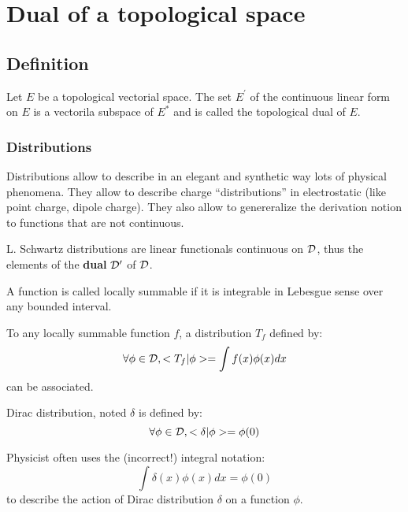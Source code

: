 \documentclass[12pt]{book}
\begin{document}
\chapter{Dual of a topological space}

\section{Definition}
\begin{defn}
Let $E$ be a topological vectorial space. The set $E^\prime$ of the
continuous linear form on $E$ is a vectorila subspace of $E^*$ and is
called the topological dual of $E$.
\end{defn}



\subsection{Distributions}\label{chapdistr}
Distributions allow to describe in an elegant and
synthetic way lots of physical phenomena. They allow to describe charge
``distributions'' in electrostatic (like point charge, dipole charge). They
also allow to genereralize the derivation notion to functions that are not
continuous. 

\begin{defn}
L. Schwartz distributions are linear functionals continuous on ${\cal D}$,
thus the elements of the {\bf dual} ${\cal D}'$ of ${\cal D}$.
\end{defn}
\begin{defn}
A function is called locally summable if it is integrable in Lebesgue sense
over any bounded interval.
\end{defn}
\begin{defn}
To any locally summable function $f$, a distribution $T_f$ defined by:
\begin{equation}
\forall \phi \in {\cal D}, <T_f|\phi>=\int f(x)\phi(x)dx
\end{equation}
can be associated.
\end{defn}
\begin{defn}
Dirac distribution,
noted $\delta$ is defined by:
\begin{equation}
\forall \phi \in {\cal D}, <\delta|\phi>=\phi(0)
\end{equation}
\end{defn}
\begin{rem}
Physicist often uses the (incorrect!) integral notation:
\begin{equation}
\int \delta(x)\phi(x)dx=\phi(0)
\end{equation}
to describe the action of Dirac distribution $\delta$ on a function $\phi$.
\end{rem}
\end{document}
